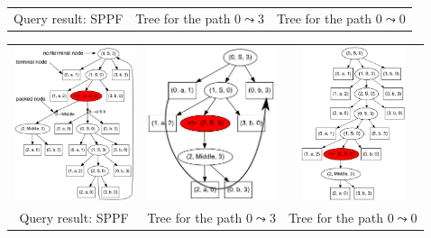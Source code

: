 \documentclass{beamer}
\begin{document}
\begin{frame}
\begin{overprint}
\begin{tabular}{  c  c  c  }
\\
\small{Query result: SPPF}
& \small{Tree for the path $0 \leadsto 3$}
& \small{Tree for the path $0 \leadsto 0$}
\end{tabular}
\begin{tabular}{  c  c  c  }
    \includegraphics[height=4.5cm]{pictures/AnBn.pdf}
    &
    \includegraphics[height=4.5cm]{pictures/AnBn_2_m.pdf}

    &
    \includegraphics[height=4.5cm]{pictures/AnBn_1.pdf}

\\
\small{Query result: SPPF}
& \small{Tree for the path $0 \leadsto 3$}
& \small{Tree for the path $0 \leadsto 0$}

\end{tabular}
\end{overprint}

\end{frame}
\end{document}

